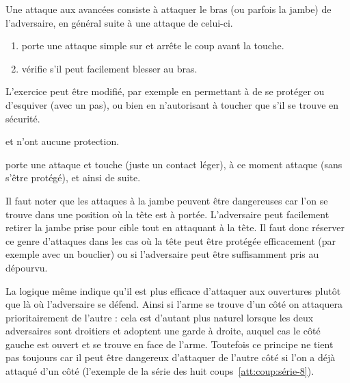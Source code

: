 \begin{coup}

	Une attaque aux avancées consiste à attaquer le bras (ou parfois la jambe) de l'adversaire, en général suite à une attaque de celui-ci.

\end{coup}


\begin{exercice}


	\begin{enumerate}
		\item \A porte une attaque simple sur \D et arrête le coup avant la touche.
		
		\item \D vérifie s'il peut facilement blesser \A au bras.
	\end{enumerate}

	L'exercice peut être modifié, par exemple en permettant à \D de se protéger ou d'esquiver (avec un pas), ou bien en n'autorisant \D à toucher \A que s'il se trouve en sécurité.
\end{exercice}


\begin{exercice}

	\A et \D n'ont aucune protection.

	\A porte une attaque et touche \D (juste un contact léger), à ce moment \D attaque \A (sans s'être protégé), et ainsi de suite.
\end{exercice}


Il faut noter que les attaques à la jambe peuvent être dangereuses car l'on se trouve dans une position où la tête est à portée.
L'adversaire peut facilement retirer la jambe prise pour cible tout en attaquant à la tête.
Il faut donc réserver ce genre d'attaques dans les cas où la tête peut être protégée efficacement (par exemple avec un bouclier) ou si l'adversaire peut être suffisamment pris au dépourvu.

La logique même indique qu'il est plus efficace d'attaquer aux ouvertures plutôt que là où l'adversaire se défend.
Ainsi si l'arme se trouve d'un côté on attaquera prioritairement de l'autre : cela est d'autant plus naturel lorsque les deux adversaires sont droitiers et adoptent une garde à droite, auquel cas le côté gauche est ouvert et se trouve en face de l'arme.
Toutefois ce principe ne tient pas toujours car il peut être dangereux d'attaquer de l'autre côté si l'on a déjà attaqué d'un côté (l'exemple de la série des huit coups~\ref{att:coup:série-8}).

